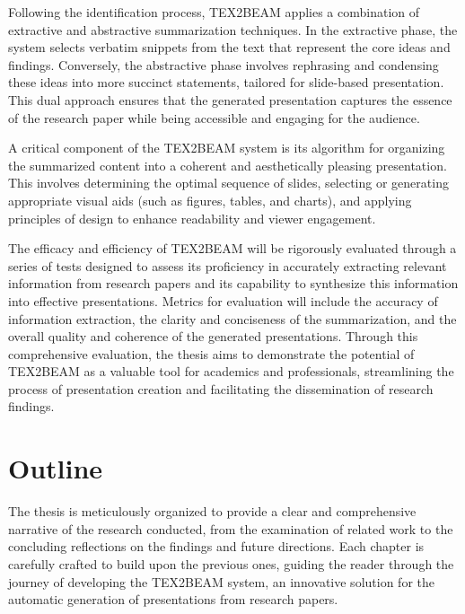 Following the identification process, TEX2BEAM applies a combination of extractive and abstractive summarization techniques. In the extractive phase, the system selects verbatim snippets from the text that represent the core ideas and findings. Conversely, the abstractive phase involves rephrasing and condensing these ideas into more succinct statements, tailored for slide-based presentation. This dual approach ensures that the generated presentation captures the essence of the research paper while being accessible and engaging for the audience.

A critical component of the TEX2BEAM system is its algorithm for organizing the summarized content into a coherent and aesthetically pleasing presentation. This involves determining the optimal sequence of slides, selecting or generating appropriate visual aids (such as figures, tables, and charts), and applying principles of design to enhance readability and viewer engagement.

The efficacy and efficiency of TEX2BEAM will be rigorously evaluated through a series of tests designed to assess its proficiency in accurately extracting relevant information from research papers and its capability to synthesize this information into effective presentations. Metrics for evaluation will include the accuracy of information extraction, the clarity and conciseness of the summarization, and the overall quality and coherence of the generated presentations. Through this comprehensive evaluation, the thesis aims to demonstrate the potential of TEX2BEAM as a valuable tool for academics and professionals, streamlining the process of presentation creation and facilitating the dissemination of research findings.


\section{Outline}
\label{sec:intro:outline}


The thesis is meticulously organized to provide a clear and comprehensive narrative of the research conducted, from the examination of related work to the concluding reflections on the findings and future directions. Each chapter is carefully crafted to build upon the previous ones, guiding the reader through the journey of developing the TEX2BEAM system, an innovative solution for the automatic generation of presentations from research papers.

